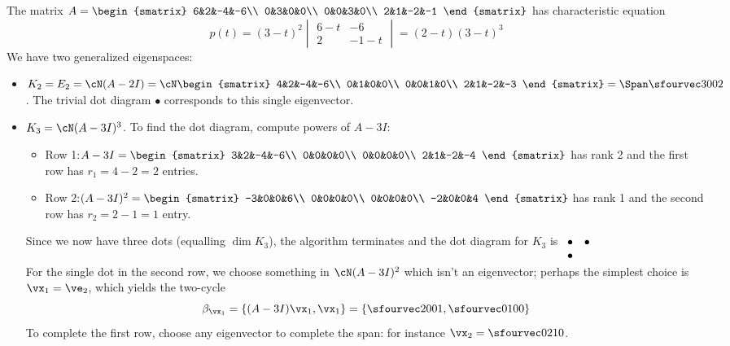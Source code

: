\begin{example}{}{}
The matrix $A=\begin{smatrix}
6&2&-4&-6\\
0&3&0&0\\
0&0&3&0\\
2&1&-2&-1
\end{smatrix}$ has characteristic equation
\[p(t)=(3-t)^2\begin{vmatrix}
6-t&-6\\2&-1-t
\end{vmatrix}
=(2-t)(3-t)^3\]
We have two generalized eigenspaces:
\begin{itemize}
  \item $K_2=E_2=\cN(A-2I)=\cN\begin{smatrix}
		4&2&-4&-6\\
		0&1&0&0\\
		0&0&1&0\\
		2&1&-2&-3
	\end{smatrix}=\Span\sfourvec 3002$. The trivial dot diagram $\bullet$ corresponds to this single eigenvector.
  \item $K_3=\cN(A-3I)^3$. To find the dot diagram, compute powers of $A-3I$:
		\begin{itemize}
		  \item[]\hspace*{-20pt}Row 1:\quad $A-3I=\begin{smatrix}
				3&2&-4&-6\\
				0&0&0&0\\
				0&0&0&0\\
				2&1&-2&-4
		  \end{smatrix}$ has rank 2 and the first row has $r_1=4-2=2$ entries.
			\item[]\hspace*{-20pt}Row 2:\quad $(A-3I)^2=\begin{smatrix}
				-3&0&0&6\\
				0&0&0&0\\
				0&0&0&0\\
				-2&0&0&4
			\end{smatrix}$ has rank 1 and the second row has $r_2=2-1=1$ entry.
		\end{itemize}
		Since we now have three dots (equalling $\dim K_3$), the algorithm terminates and the dot diagram for $K_3$ is $\begin{array}[t]{cc}
\bullet&\bullet\\\bullet&
\end{array}$\\
For the single dot in the second row, we choose something in $\cN(A-3I)^2$ which isn't an eigenvector; perhaps the simplest choice is $\vx_1=\ve_2$, which yields the two-cycle
\[\beta_{\vx_1}=\left\{(A-3I)\vx_1,\vx_1\right\} =\left\{\sfourvec 2001,\sfourvec 0100\right\}\]
To complete the first row, choose any eigenvector to complete the span: for instance $\vx_2=\sfourvec 0210$.
\end{itemize}


\end{example}
